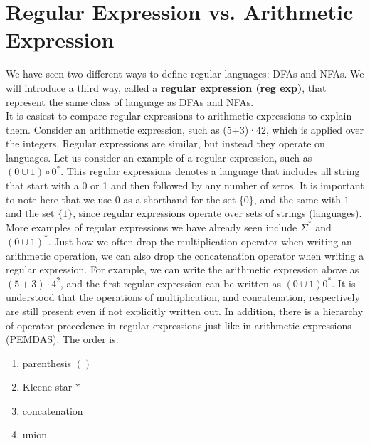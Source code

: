 \documentclass[11pt,a4paper]{article}
\begin{document}
\tableofcontents


\section{Regular Expression vs. Arithmetic Expression}

We have seen two different ways to define regular languages: DFAs and NFAs. We
will introduce a third way, called a \textbf{regular expression (reg exp)}, that represent the same class of
language as DFAs and NFAs. \\

It is easiest to compare regular expressions to arithmetic expressions to explain them. Consider an arithmetic expression, such as (5+3)·42, which is applied over the integers.
Regular expressions are similar, but instead they operate on languages. Let us consider an example of a regular expression, such as $(0\cup 1)\circ 0^*$.
This regular expressions denotes a language that includes all string that start with a 0 or 1 and then followed by any number of zeros.
It is important to note here that we use $0$ as a shorthand for the set $\{0\}$, and the same with $1$ and the set $\{1\}$, since regular expressions operate over sets of strings (languages).
More examples of regular expressions we have already seen include $\Sigma^*$ and $(0\cup1)^*$.
Just how we often drop the multiplication operator when writing an arithmetic operation, we can also drop the concatenation operator when writing a regular expression.
For example, we can write the arithmetic expression above as $(5+3)\cdot4^2$, and the first regular expression can be written as $(0\cup 1)0^*$.
It is understood that the operations of multiplication, and concatenation, respectively are still present even if not explicitly written out.
In addition, there is a hierarchy of operator precedence in regular expressions just like in arithmetic expressions (PEMDAS). The order is:
\begin{enumerate}
    \item parenthesis $()$
    \item Kleene star $*$
    \item concatenation
    \item union
\end{enumerate}
\end{document}
